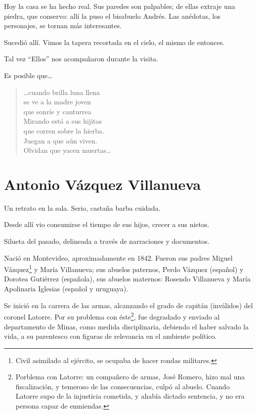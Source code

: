 \documentclass{article}
\begin{document}
Hoy la casa se ha hecho real. Sus paredes son palpables; de ellas extraje una piedra, que conservo: allí la puso el bisabuelo Andrés. Las anédotas, los personajes, se tornan más interesantes. 

Sucedió allí. Vimos la tapera recortada en el cielo, el mismo de entonces.

Tal vez ``Ellos'' nos acompañaron durante la visita.

Es posible que\ldots

\begin{verse}
    \ldots cuando brilla luna llena\\
    se ve a la madre joven\\
    que sonríe y canturrea\\
    Mirando está a sus hijitas\\
    que corren sobre la hierba.\\
    Juegan a que aún viven.\\
    Olvidan que yacen muertas\ldots
\end{verse}

\section{Antonio Vázquez Villanueva}

Un retrato en la sala. Serio, castaña barba cuidada.

Desde allí vio consumirse el tiempo de sus hijos, crecer a sus nietos. 

Silueta del pasado, delineada a través de narraciones y documentos.

Nació en Montevideo, aproximadamente en 1842. Fueron sus padres Miguel Vázquez\footnote{Civil asimilado al ejército, se ocupaba de hacer rondas militares.} y María Villanueva; sus abuelos paternos, Perdo Vázquez (español) y Dorotea Gutiérrez (española), sus abuelos maternos: Rosendo Villanueva y María Apolinaria Iglesias (español y uruguaya).

Se inició en la carrera de las armas, alcanzando el grado de capitán (inválidos) del coronel Latorre. Por su problema con éste\footnote{Porblema con Latorre: un compañero de armas, José Romero, hizo mal una fiscalización, y temeroso de las consecuencias, culpó al abuelo. Cuando Latorre supo de la injusticia cometida, y ahabía dictado sentencia, y no era persona capaz de enmiendas.}, fue degradado y enviado al departamento de Minas, como medida disciplinaria, debiendo el haber salvado la vida, a su parentesco con figuras de relevancia en el ambiente político.
\end{document}
